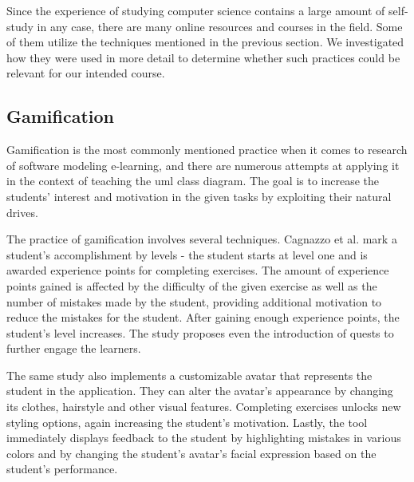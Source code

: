 Since the experience of studying computer science contains a large amount of self-study in any case, there are many online resources and courses in the field. Some of them utilize the techniques mentioned in the previous section. We investigated how they were used in more detail to determine whether such practices could be relevant for our intended course. 

\subsection{Gamification}

Gamification is the most commonly mentioned practice when it comes to research of software modeling e-learning, and there are numerous attempts at applying it in the context of teaching the \ac{uml} class diagram. The goal is to increase the students' interest and motivation in the given tasks by exploiting their natural drives. 


The practice of gamification involves several techniques. Cagnazzo et al.\cite{cagnazzo2023umlegend} mark a student's accomplishment by levels - the student starts at level one and is awarded experience points for completing exercises. The amount of experience points gained is affected by the difficulty of the given exercise as well as the number of mistakes made by the student, providing additional motivation to reduce the mistakes for the student. After gaining enough experience points, the student's level increases. The study proposes even the introduction of quests to further engage the learners.

The same study also implements a customizable avatar that represents the student in the application. They can alter the avatar's appearance by changing its clothes, hairstyle and other visual features. Completing exercises unlocks new styling options, again increasing the student's motivation. Lastly, the tool immediately displays feedback to the student by highlighting mistakes in various colors and by changing the student's avatar's facial expression based on the student's performance.

